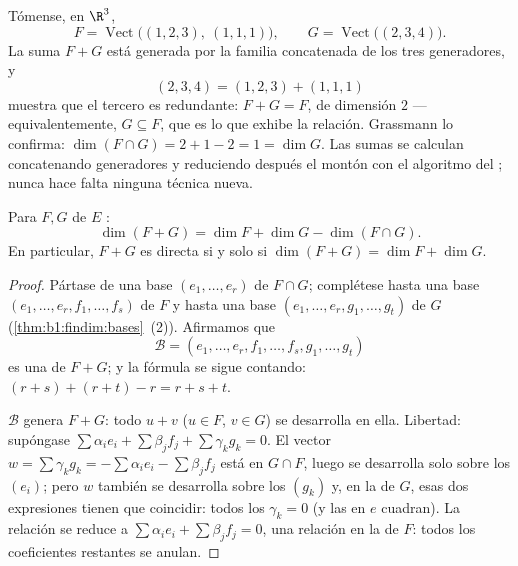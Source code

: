 \begin{example}
\label{ex:b1:findim:sumconcat}
Tómense, en $\R^3$,
\[
F = \operatorname{Vect}\bigl((1,2,3),\ (1,1,1)\bigr),
\qquad
G = \operatorname{Vect}\bigl((2,3,4)\bigr) .
\]
La suma $F + G$ está generada por la familia concatenada de los tres
generadores, y
\[
(2, 3, 4) = (1, 2, 3) + (1, 1, 1)
\]
muestra que el tercero es redundante: $F + G = F$, de dimensión $2$
--- equivalentemente, $G \subseteq F$, que es lo que exhibe la
relación. Grassmann lo confirma: $\dim(F \cap G) = 2 + 1 - 2 = 1 =
\dim G$. Las sumas se calculan concatenando generadores y reduciendo
después el montón con el algoritmo del ; nunca hace falta
ninguna técnica nueva.
\end{example}

\begin{theorem}\label{thm:b1:findim:grassmann}
Para  $F, G$ de $E$ :
\[
\dim(F + G) = \dim F + \dim G - \dim(F \cap G) .
\]
En particular, $F + G$ es directa si y solo si $\dim(F + G) = \dim F + \dim G$.
\end{theorem}

\begin{proof}
Pártase de una base $(e_1, \dots, e_r)$ de $F \cap G$; complétese
hasta una base $(e_1, \dots, e_r, f_1, \dots, f_s)$ de $F$ y hasta una
base $(e_1, \dots, e_r, g_1, \dots, g_t)$ de $G$
(\cref{thm:b1:findim:bases}~(2)). Afirmamos que
\[
\mathcal{B} = (e_1, \dots, e_r, f_1, \dots, f_s, g_1, \dots, g_t)
\]
es una  de $F + G$; y la fórmula se sigue contando:
$(r + s) + (r + t) - r = r + s + t$.

$\mathcal{B}$ genera $F + G$: todo $u + v$ ($u \in F$, $v \in G$) se
desarrolla en ella. Libertad: supóngase
$\sum \alpha_i e_i + \sum \beta_j f_j + \sum \gamma_k g_k = 0$. El
vector $w = \sum \gamma_k g_k = -\sum\alpha_i e_i - \sum\beta_j f_j$
está en $G \cap F$, luego se desarrolla solo sobre los $(e_i)$; pero
$w$ también se desarrolla sobre los $(g_k)$ y, en la  de $G$,
esas dos expresiones tienen que coincidir: todos los
$\gamma_k = 0$ (y las  en $e$ cuadran). La relación se
reduce a $\sum\alpha_i e_i + \sum\beta_j f_j = 0$, una relación en la
 de $F$: todos los coeficientes restantes se anulan.
\end{proof}

